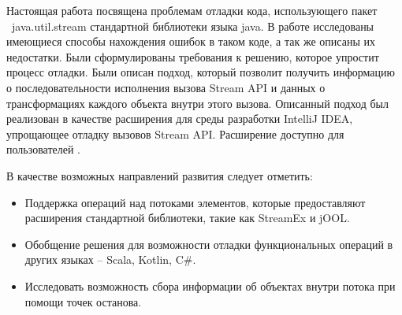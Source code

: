 Настоящая работа посвящена проблемам отладки кода, использующего пакет \ java.util.stream стандартной библиотеки языка java. В работе исследованы имеющиеся способы нахождения ошибок в таком коде, а так же описаны их недостатки. Были сформулированы требования к решению, которое упростит процесс отладки. Были описан подход, который позволит получить информацию о последовательности исполнения вызова Stream API и данных о трансформациях каждого объекта внутри этого вызова. Описанный подход был реализован в качестве расширения для среды разработки IntelliJ IDEA, упрощающее отладку вызовов Stream API. Расширение доступно для пользователей \cite{java:stream-debugger}.

В качестве возможных направлений развития следует отметить:

\begin{itemize}
	\item Поддержка операций над потоками элементов, которые предоставляют расширения стандартной библиотеки, такие как StreamEx и jOOL.
	\item Обобщение решения для возможности отладки функциональных операций в других языках -- Scala, Kotlin, C\#.
	\item Исследовать возможность сбора информации об объектах внутри потока при помощи точек останова.
\end{itemize}